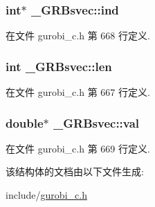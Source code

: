 \subsubsection[{\texorpdfstring{ind}{ind}}]{\setlength{\rightskip}{0pt plus 5cm}int$\ast$ \+\_\+\+G\+R\+Bsvec\+::ind}\hypertarget{struct__GRBsvec_a4a00220bb01e90ee6ce1f79b26a60095}{}\label{struct__GRBsvec_a4a00220bb01e90ee6ce1f79b26a60095}


在文件 gurobi\+\_\+c.\+h 第 668 行定义.

\subsubsection[{\texorpdfstring{len}{len}}]{\setlength{\rightskip}{0pt plus 5cm}int \+\_\+\+G\+R\+Bsvec\+::len}\hypertarget{struct__GRBsvec_a66e2892be214468f89d8512430a14428}{}\label{struct__GRBsvec_a66e2892be214468f89d8512430a14428}


在文件 gurobi\+\_\+c.\+h 第 667 行定义.

\subsubsection[{\texorpdfstring{val}{val}}]{\setlength{\rightskip}{0pt plus 5cm}double$\ast$ \+\_\+\+G\+R\+Bsvec\+::val}\hypertarget{struct__GRBsvec_abb0d4946d18c0bcb33a0e132cb470c01}{}\label{struct__GRBsvec_abb0d4946d18c0bcb33a0e132cb470c01}


在文件 gurobi\+\_\+c.\+h 第 669 行定义.



该结构体的文档由以下文件生成\+:\begin{DoxyCompactItemize}
\item 
include/\hyperlink{gurobi__c_8h}{gurobi\+\_\+c.\+h}\end{DoxyCompactItemize}
